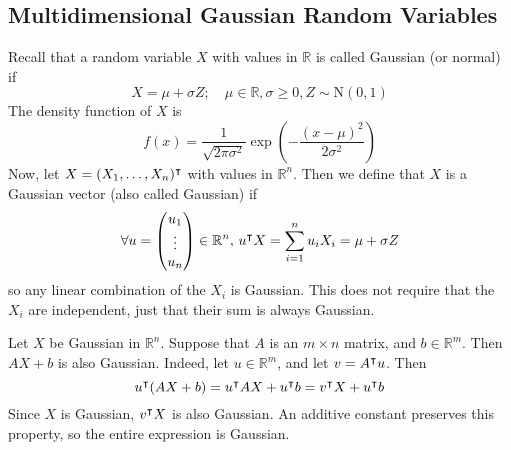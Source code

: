 \subsection{Multidimensional Gaussian Random Variables}
Recall that a random variable \(X\) with values in \(\mathbb R\) is called Gaussian (or normal) if
\[
	X = \mu + \sigma Z;\quad \mu \in \mathbb R, \sigma \geq 0, Z \sim \mathrm{N}(0, 1)
\]
The density function of \(X\) is
\[
	f(x) = \frac{1}{\sqrt{2\pi\sigma^2}} \exp(-\frac{(x-\mu)^2}{2\sigma^2})
\]
Now, let \(X = (X_1, \dots, X_n)^\intercal\) with values in \(\mathbb R^n\).
Then we define that \(X\) is a Gaussian vector (also called Gaussian) if
\[
	\forall u = \begin{pmatrix}
		u_1 \\ \vdots \\ u_n
	\end{pmatrix} \in \mathbb R^n,\, u^\intercal X = \sum_{i=1}^n u_i X_i = \mu + \sigma Z
\]
so any linear combination of the \(X_i\) is Gaussian.
This does not require that the \(X_i\) are independent, just that their sum is always Gaussian.

Let \(X\) be Gaussian in \(\mathbb R^n\).
Suppose that \(A\) is an \(m \times n\) matrix, and \(b \in \mathbb R^m\).
Then \(AX + b\) is also Gaussian.
Indeed, let \(u \in \mathbb R^m\), and let \(v = A^\intercal u\).
Then
\[
	u^\intercal(AX + b) = u^\intercal AX + u^\intercal b = v^\intercal X + u^\intercal b
\]
Since \(X\) is Gaussian, \(v^\intercal X\) is also Gaussian.
An additive constant preserves this property, so the entire expression is Gaussian.
